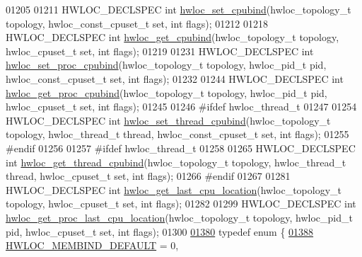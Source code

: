 \begin{DoxyCode}
01205 
01211 HWLOC\_DECLSPEC \textcolor{keywordtype}{int} \hyperlink{a00190_ga80bc07473a8edf840cae17bd7ec21d48}{hwloc\_set\_cpubind}(hwloc\_topology\_t topology, hwloc\_const\_cpuset\_t \textcolor{keyword}{set}, \textcolor{keywordtype}{
      int} flags);
01212 
01218 HWLOC\_DECLSPEC \textcolor{keywordtype}{int} \hyperlink{a00190_gacba7ecb979baf824d5240fa2cb2a8be6}{hwloc\_get\_cpubind}(hwloc\_topology\_t topology, hwloc\_cpuset\_t \textcolor{keyword}{set}, \textcolor{keywordtype}{int} 
      flags);
01219 
01231 HWLOC\_DECLSPEC \textcolor{keywordtype}{int} \hyperlink{a00190_ga296db8a3c6d49b51fb83d6f3e45c02a6}{hwloc\_set\_proc\_cpubind}(hwloc\_topology\_t topology, hwloc\_pid\_t pid,
       hwloc\_const\_cpuset\_t \textcolor{keyword}{set}, \textcolor{keywordtype}{int} flags);
01232 
01244 HWLOC\_DECLSPEC \textcolor{keywordtype}{int} \hyperlink{a00190_gac82de91f788fa82dacf99c6e0d4b7158}{hwloc\_get\_proc\_cpubind}(hwloc\_topology\_t topology, hwloc\_pid\_t pid,
       hwloc\_cpuset\_t \textcolor{keyword}{set}, \textcolor{keywordtype}{int} flags);
01245 
01246 \textcolor{preprocessor}{#ifdef hwloc\_thread\_t}
01247 
01254 HWLOC\_DECLSPEC \textcolor{keywordtype}{int} \hyperlink{a00190_gae42c01b2addcfbf6048b9a516dd7a906}{hwloc\_set\_thread\_cpubind}(hwloc\_topology\_t topology, 
      hwloc\_thread\_t thread, hwloc\_const\_cpuset\_t \textcolor{keyword}{set}, \textcolor{keywordtype}{int} flags);
01255 \textcolor{preprocessor}{#endif}
01256 
01257 \textcolor{preprocessor}{#ifdef hwloc\_thread\_t}
01258 
01265 HWLOC\_DECLSPEC \textcolor{keywordtype}{int} \hyperlink{a00190_gaf13f765642b5d0d9a9813e6bb043671b}{hwloc\_get\_thread\_cpubind}(hwloc\_topology\_t topology, 
      hwloc\_thread\_t thread, hwloc\_cpuset\_t \textcolor{keyword}{set}, \textcolor{keywordtype}{int} flags);
01266 \textcolor{preprocessor}{#endif}
01267 
01281 HWLOC\_DECLSPEC \textcolor{keywordtype}{int} \hyperlink{a00190_gafdb374627358bf09203b5a4215b13032}{hwloc\_get\_last\_cpu\_location}(hwloc\_topology\_t topology, 
      hwloc\_cpuset\_t \textcolor{keyword}{set}, \textcolor{keywordtype}{int} flags);
01282 
01299 HWLOC\_DECLSPEC \textcolor{keywordtype}{int} \hyperlink{a00190_ga910a05c2d47f68a3155bf176b50fa555}{hwloc\_get\_proc\_last\_cpu\_location}(hwloc\_topology\_t 
      topology, hwloc\_pid\_t pid, hwloc\_cpuset\_t \textcolor{keyword}{set}, \textcolor{keywordtype}{int} flags);
01300 
\hyperlink{a00191_gac9764f79505775d06407b40f5e4661e8}{01380} \textcolor{keyword}{typedef} \textcolor{keyword}{enum} \{
\hyperlink{a00191_ggac9764f79505775d06407b40f5e4661e8a18675bb80ebc1bce5b652e9de8f3998c}{01388}   \hyperlink{a00191_ggac9764f79505775d06407b40f5e4661e8a18675bb80ebc1bce5b652e9de8f3998c}{HWLOC\_MEMBIND\_DEFAULT} =  0,

\end{DoxyCode}
